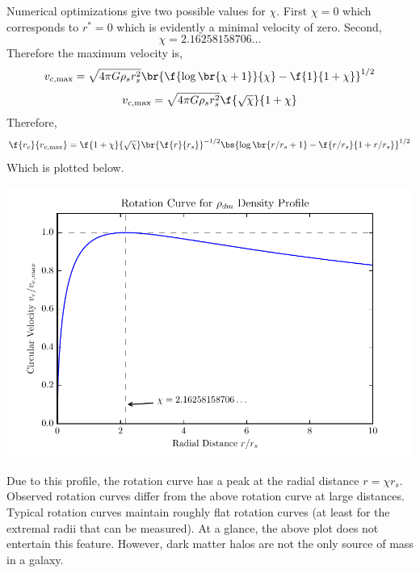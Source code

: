 \documentclass{article}
\begin{document}
Numerical optimizations give two possible values for $\chi$. First $\chi = 0$ which corresponds to $r^{*} = 0$ which is evidently a minimal velocity of zero. Second,
\[ \chi = 2.16258158706\ldots \]
Therefore the maximum velocity is,
\[ v_{c,\text{max}} = \sqrt{4 \pi G \rho_s r_s^2} \br{\f{\log\br{\chi+1}}{\chi}-\f{1}{1 + \chi}}^{1/2} \]
\[ v_{c,\text{max}} = \sqrt{4 \pi G \rho_s r_s^2} \f{\sqrt{\chi}}{1 + \chi} \]
Therefore,
\[ \f{v_c}{v_{c,\text{max}}} = \f{1 + \chi}{\sqrt{\chi}} \br{\f{r}{r_s}}^{-1/2} \bs{\log\br{r/r_s+1}-\f{r/r_s}{1 + r/r_s}}^{1/2} \]
Which is plotted below.
\begin{center}
    \includegraphics{figures/rotation_curve.pdf}
\end{center}

Due to this profile, the rotation curve has a peak at the radial distance $r = \chi r_s$. Observed rotation curves differ from the above rotation curve at large distances. Typical rotation curves maintain roughly flat rotation curves (at least for the extremal radii that can be measured). At a glance, the above plot does not entertain this feature. However, dark matter halos are not the only source of mass in a galaxy.\\
\end{document}
